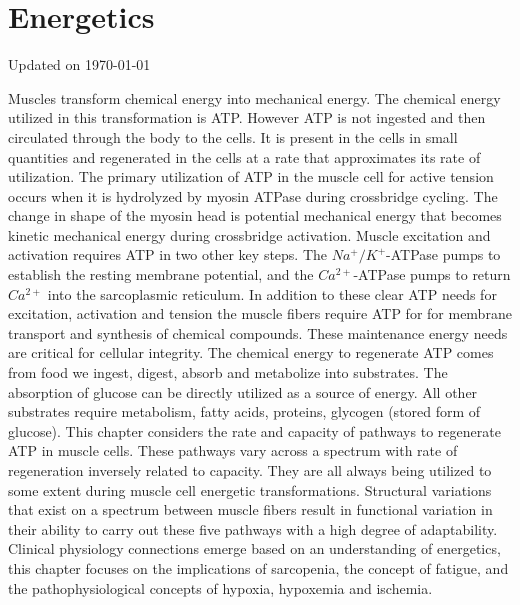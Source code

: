\chapter{Energetics}\label{chp:energetics}
Updated on \today
\minitoc

Muscles transform chemical energy into mechanical energy. The chemical energy utilized in this transformation is ATP. However ATP is not ingested and then circulated through the body to the cells. It is present in the cells in small quantities and regenerated in the cells at a rate that approximates its rate of utilization. The primary utilization of ATP in the muscle cell for active tension occurs when it is hydrolyzed by myosin ATPase during crossbridge cycling. The change in shape of the myosin head is potential mechanical energy that becomes kinetic mechanical energy during crossbridge activation. Muscle excitation and activation requires ATP in two other key steps. The $Na^+ / K^+$-ATPase pumps to establish the resting membrane potential, and the $Ca^{2+}$-ATPase pumps to return $Ca^{2+}$ into the sarcoplasmic reticulum. In addition to these clear ATP needs for excitation, activation and tension the muscle fibers require ATP for for membrane transport and synthesis of chemical compounds. These maintenance energy needs are critical for cellular integrity. 
The chemical energy to regenerate ATP comes from food we ingest, digest, absorb and metabolize into substrates. The absorption of glucose can be directly utilized as a source of energy. All other substrates require metabolism, fatty acids, proteins, glycogen (stored form of glucose).
This chapter considers the rate and capacity of pathways to regenerate ATP in muscle cells. These pathways vary across a spectrum with rate of regeneration inversely related to capacity. They are all always being utilized to some extent during muscle cell energetic transformations. Structural variations that exist on a spectrum between muscle fibers result in functional variation in their ability to carry out these five pathways with a high degree of adaptability. Clinical physiology connections emerge based on an understanding of energetics, this chapter focuses on the implications of sarcopenia, the concept of fatigue, and the pathophysiological concepts of hypoxia, hypoxemia and ischemia.

\vspace{5mm}

